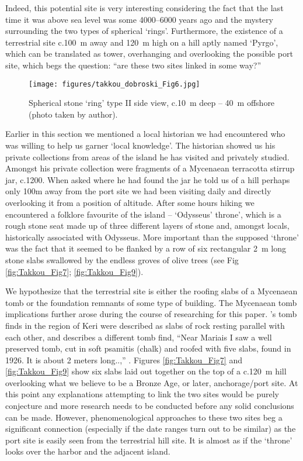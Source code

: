 Indeed, this potential site is very interesting considering the fact that the last time it was above sea level was some \num{4000}--\num{6000} years ago \parencite{Flemming_2014} 
and the mystery surrounding the two types of spherical ‘rings’. Furthermore, the existence of a terrestrial site c.\SI{100}{\metre} away and \SI{120}{\metre} high
 on a hill aptly named ‘Pyrgo’, which can be translated as tower, overhanging and overlooking the possible port site, which begs the question: “are these two sites linked in some way?”
	
\begin{figure}[!htb]
	\texttt{[image: figures/takkou\_dobroski\_Fig6.jpg]}
	\centering
	\caption{Spherical stone ‘ring’ type II side view, c.\SI{10}{\metre} deep – \SI{40}{\metre} offshore (photo taken by author).}
	\label{fig:Takkou_Fig6}
\end{figure}

Earlier in this section we mentioned a local historian we had encountered who was willing to help us garner ‘local knowledge’. The historian showed us his private collections from areas of the island he has visited and privately studied. Amongst his private collection were fragments of a Mycenaean terracotta stirrup jar, c.1200\BC. When asked where he had found the jar he told us of a hill perhaps only 100m away from the port site we had been visiting daily and directly overlooking it from a position of altitude. After some hours hiking we encountered a folklore favourite of the island – ‘Odysseus’ throne’, which is a rough stone seat made up of three different layers of stone and, amongst locals, historically associated with Odysseus. More important than the supposed ‘throne’ was the fact that it seemed to be flanked by a row of six rectangular \SI{2}{\metre} long stone slabs swallowed by the endless groves of olive trees (see Fig \ref{fig:Takkou_Fig7}; \ref{fig:Takkou_Fig9}).

We hypothesize that the terrestrial site is either the roofing slabs of a Mycenaean tomb or the foundation remnants of some type of building. The Mycenaean tomb implications further arose during the course of researching for this paper. \textcite{Agallopoulou_1973}'s tomb finds in the region of Keri were described as slabs of rock resting parallel with each other, and \textcite{Benton_1933} describes a different tomb find, “Near Mariais I saw a well preserved tomb, cut in soft psamitis (chalk) and roofed with five slabs, found in 1926. It is about 2 meters long..,” \parencite[21]{Benton_1933}. Figures \ref{fig:Takkou_Fig7} and \ref{fig:Takkou_Fig9} show six slabs laid out together on the top of a c.\SI{120}{\metre} hill overlooking what we believe to be a Bronze Age, or later, anchorage/port site. At this point any explanations attempting to link the two sites would be purely conjecture and more research needs to be conducted before any solid conclusions can be made. However, phenomenological approaches to these two sites beg a significant connection (especially if the date ranges turn out to be similar) as the port site is easily seen from the terrestrial hill site. It is almost as if the ‘throne’ looks over the harbor and the adjacent island.


